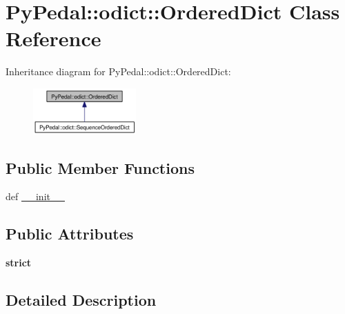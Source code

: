 \hypertarget{classPyPedal_1_1odict_1_1OrderedDict}{
\section{PyPedal::odict::OrderedDict Class Reference}
\label{classPyPedal_1_1odict_1_1OrderedDict}
}
Inheritance diagram for PyPedal::odict::OrderedDict:\nopagebreak
\begin{figure}[H]
\begin{center}
\leavevmode
\includegraphics[width=112pt]{classPyPedal_1_1odict_1_1OrderedDict__inherit__graph}
\end{center}
\end{figure}
\subsection*{Public Member Functions}
\begin{CompactItemize}
\item 
def \hyperlink{classPyPedal_1_1odict_1_1OrderedDict_2819b83b7012be60ef9936b6716b9f7c}{\_\-\_\-init\_\-\_\-}
\end{CompactItemize}
\subsection*{Public Attributes}
\begin{CompactItemize}
\item 
\hypertarget{classPyPedal_1_1odict_1_1OrderedDict_dbf73fc52ea0685a8d964b1c279a0c29}{
\textbf{strict}}
\label{classPyPedal_1_1odict_1_1OrderedDict_dbf73fc52ea0685a8d964b1c279a0c29}

\end{CompactItemize}


\subsection{Detailed Description}


